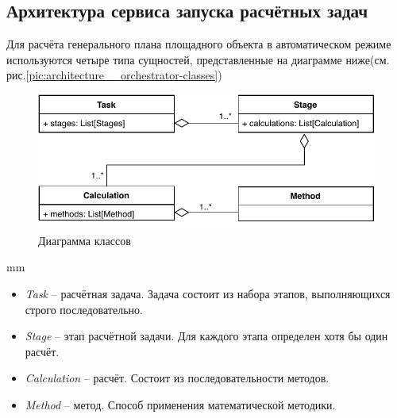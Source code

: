 \subsection{\large{Архитектура сервиса запуска расчётных задач}}



Для расчёта генерального плана площадного объекта в автоматическом режиме используются четыре типа сущностей,
представленные на диаграмме ниже(см. рис.\ref{pic:architecture__orchestrator-classes})
\begin{figure}[H]
	\includegraphics[width=\textwidth]{architecture/pictures/orchestrator/classes}
	\caption{Диаграмма классов}
	\label{pic:architecture__orchestrator-classes-1}
\end{figure}
 mm

\begin{itemize}
	\item {
		\textit{Task} -- расчётная задача. Задача состоит из набора этапов, выполняющихся строго последовательно.
	}
	\item {
		\textit{Stage} -- этап расчётной задачи. Для каждого этапа определен хотя бы один расчёт.
	}
	\item {
		\textit{Calculation} -- расчёт. Состоит из последовательности методов.
	}
	\item {
		\textit{Method} -- метод. Способ применения математической методики.
	}
\end{itemize}


